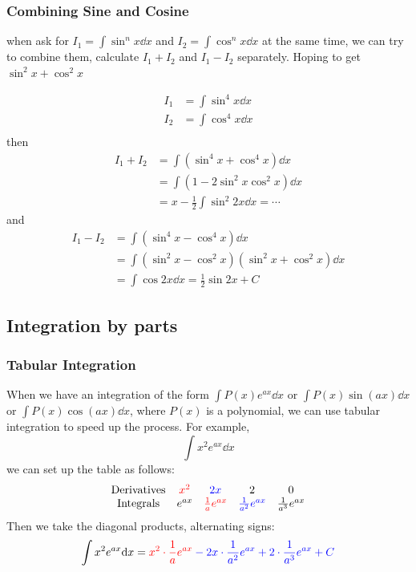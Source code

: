 \documentclass{overview}
\begin{document}
\subsubsection{Combining Sine and Cosine}
when ask for $I_1=\int \sin^n x \dd x$ and $I_2=\int \cos^n x \dd x$ at the same time,
we can try to combine them, calculate $I_1 + I_2$ and $I_1 - I_2$ separately.
Hoping to get $\sin^2 x + \cos^2 x$
\begin{example}
	\[
		\begin{aligned}
		I_1 &= \int \sin^4 x \dd x \\
		I_2 &= \int \cos^4 x \dd x \\
		\end{aligned}
	\] 
	then
	\[
		\begin{aligned}
		I_1 + I_2 &= \int (\sin^4 x + \cos^4 x) \dd x \\
							&= \int (1 - 2 \sin^2 x \cos^2 x) \dd x \\
							&= x - \frac{1}{2} \int \sin^2 2x \dd x = \cdots
		\end{aligned}
	\]
	and
	\[
		\begin{aligned}
		I_1 - I_2 &= \int (\sin^4 x - \cos^4 x) \dd x \\
							&= \int (\sin^2 x - \cos^2 x)(\sin^2 x + \cos^2 x) \dd x \\
							&= \int \cos 2x \dd x = \frac{1}{2} \sin 2x + C
		\end{aligned}
	\]
\end{example}

\subsection{Integration by parts}
\subsubsection{Tabular Integration}
When we have an integration of the form $\int P(x) e^{ax} \dd x$ or $\int P(x) 
\sin(ax) \dd x$ or $\int P(x) \cos(ax) \dd x$, where $P(x)$ is a polynomial, we
can use tabular integration to speed up the process. For example,
\[
	\int x^2 e^{ax} \dd x
\]
we can set up the table as follows:
\[
	\begin{array}{ccccc}
		\text{Derivatives} & \color{red}x^2 & \color{blue}2x & 2 & 0 \\
		\text{Integrals} & e^{ax} & \color{red}\frac{1}{a} e^{ax} & \color{blue}\frac{1}{a^2} e^{ax} & \frac{1}{a^3} e^{ax} \\
	\end{array}
\]
Then we take the diagonal products, alternating signs:
\[
	\int x^2 e^{ax} \mathrm{d} x = \color{red}x^2 \cdot \frac{1}{a} e^{ax}
				\color{blue} - 2x \cdot \frac{1}{a^2} e^{ax}
				+ 2 \cdot \frac{1}{a^3} e^{ax} + C
\]
\end{document}
